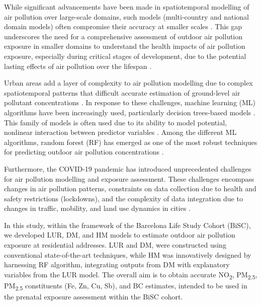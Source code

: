 \documentclass{article}
\begin{document}
While significant advancements have been made in spatiotemporal modelling of air pollution over large-scale domains, such models (multi-country and national domain models) often compromise their accuracy at smaller scales \cite{dehoogh2016, chen2019, chen2020, shen2022}. This gap underscores the need for a comprehensive assessment of outdoor air pollution exposure in smaller domains to understand the health impacts of air pollution exposure, especially during critical stages of development, due to the potential lasting effects of air pollution over the lifespan \cite{selevan2000, wick2010, ghosh2021}. 

Urban areas add a layer of complexity to air pollution modelling due to complex spatiotemporal patterns that difficult accurate estimation of ground-level air pollutant concentrations \cite{sokhi2022}. In response to these challenges, machine learning (ML) algorithms have been increasingly used, particularly decision trees-based models \cite{liu2022}. This family of models is often used due to its ability to model potential, nonlinear interaction between predictor variables \cite{liu2022treebased}. Among the different ML algorithms, random forest (RF) has emerged as one of the most robust techniques for predicting outdoor air pollution concentrations \cite{chen2019, chen2020, stafoggia2019, stafoggia2020, schneider2020, mila2023}.

Furthermore, the COVID-19 pandemic has introduced unprecedented challenges for air pollution modelling and exposure assessment. These challenges encompass changes in air pollution patterns, constraints on data collection due to health and safety restrictions (lockdowns), and the complexity of data integration due to changes in traffic, mobility, and land use dynamics in cities \cite{gonzalez2022, querol2021}. 
 
In this study, within the framework of the Barcelona Life Study Cohort (BiSC), we developed LUR, DM, and HM models to estimate outdoor air pollution exposure at residential addresses. LUR and DM, were constructed using conventional state-of-the-art techniques, while HM was innovatively designed by harnessing RF algorithm, integrating outputs from DM with explanatory variables from the LUR model. The overall aim is to obtain accurate NO\textsubscript{2}, PM\textsubscript{2.5}, PM\textsubscript{2.5} constituents (Fe, Zn, Cu, Sb), and BC estimates, intended to be used in the prenatal exposure assessment within the BiSC cohort. 

\end{document}
